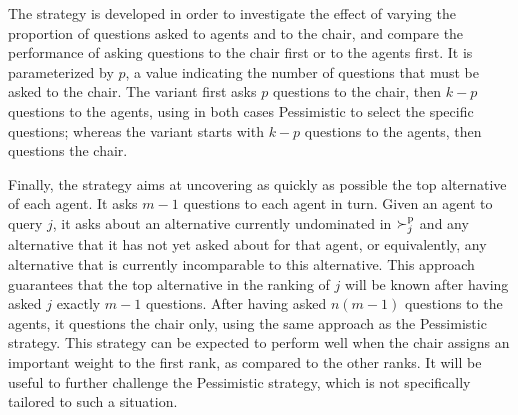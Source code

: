 \documentclass[sigconf, anonymous]{aamas}
\begin{document}
The  strategy is developed in order to investigate the effect of varying the proportion of questions asked to agents and to the chair, and compare the performance of asking questions to the chair first or to the agents first. It is parameterized by $p$, a value indicating the number of questions that must be asked to the chair.
The  variant first asks $p$ questions to the chair, then $k-p$ questions to the agents, using in both cases Pessimistic to select the specific questions; whereas the  variant starts with $k - p$ questions to the agents, then questions the chair. 

Finally, the  strategy aims at uncovering as quickly as possible the top alternative of each agent. It asks $m-1$ questions to each agent in turn. 
Given an agent to query $j$, it asks about an alternative currently undominated in $\succ^\text{p}_j$ and any alternative that it has not yet asked about for that agent, or equivalently, any alternative that is currently incomparable to this alternative. This approach guarantees that the top alternative in the ranking of $j$ will be known after having asked $j$ exactly $m-1$ questions.
After having asked $n (m-1)$ questions to the agents, it questions the chair only, using the same approach as the Pessimistic strategy.
This strategy can be expected to perform well when the chair assigns an important weight to the first rank, as compared to the other ranks. It will be useful to further challenge the Pessimistic strategy, which is not specifically tailored to such a situation.

\end{document}
